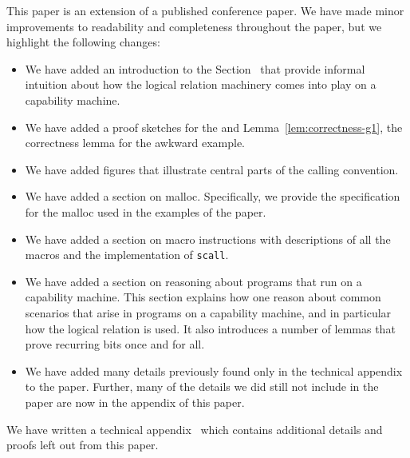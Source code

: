 \documentclass[format=acmsmall, review=true, screen=true]{acmart}
\renewcommand{\sectionname}{Section}
\newenvironment{toplas}{}{}
\begin{document}
\begin{toplas}
  This paper is an extension of a published conference paper\citep{Skorstengaard:esop18}.
  We have made minor improvements to readability and completeness throughout the paper, but we highlight the following changes:
  \begin{itemize}
  \item We have added an introduction to the \sectionname~ that provide informal intuition about how the logical relation machinery comes into play on a capability machine.
  \item We have added a proof sketches for the  and Lemma~\ref{lem:correctness-g1}, the correctness lemma for the awkward example.
  \item We have added figures that illustrate central parts of the calling convention.
  \item We have added a section on malloc.
    Specifically, we provide the specification for the malloc used in the examples of the paper.
  \item We have added a section on macro instructions with descriptions of all the macros and the implementation of \texttt{scall}.
  \item We have added a section on reasoning about programs that run on a capability machine.
    This section explains how one reason about common scenarios that arise in programs on a capability machine, and in particular how the logical relation is used.
    It also introduces a number of lemmas that prove recurring bits once and for all.
  \item We have added many details previously found only in the technical appendix~\citep{technical_appendix} to the paper.
    Further, many of the details we did still not include in the paper are now in the appendix of this paper.
  \end{itemize}
\end{toplas}

We have written a technical appendix~\citep{technical_appendix} which contains
additional details and proofs left out from this paper.
\end{document}
